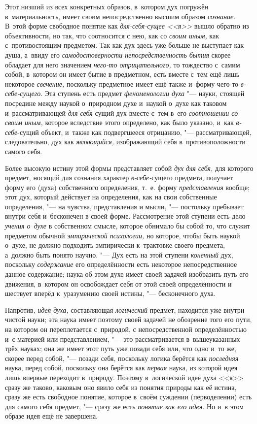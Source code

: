 Этот низший из всех конкретных образов, в~котором дух погружён
в~материальность, имеет своим непосредственно высшим образом
{\em сознание}. В~этой
форме свободное понятие как
{\em для-себя-сущее <<я>>}
вышло обратно из объективности, но так, что соотносится с
нею, как со {\em своим иным,}
как с~противостоящим предметом. Так как дух здесь уже больше
не выступает как душа, а~ввиду его
{\em самодостоверности
непосредственность бытия} скорее обладает для него значением
{\em чего-то отрицательного,}
то тождество с~самим собой, в~котором он имеет бытие в
предметном, есть вместе с~тем ещё лишь некоторое
{\em свечение,} поскольку
предметное имеет ещё также и~форму чего-то
{\em в-себе-сущего}. Эта
ступень есть предмет {\em феноменологии
духа} "--- науки, стоящей посредине между наукой о~природном
духе и~наукой о~духе как таковом и~рассматривающей
{\em для-себя}-сущий
дух вместе с~тем в~его {\em соотношении
со своим иным,} которое вследствие этого определено, как
было указано, и~как
{\em в-себе}-сущий
объект, и~также как подвергшееся отрицанию, "---
рассматривающей, следовательно, дух как
{\em являющийся,}
изображающий себя в~противоположности самого себя.

Более высокую истину этой формы представляет собой
{\em дух для себя,} для
которого предмет, носящий для сознания характер
{\em в-себе-}сущего
предмета, получает форму его (духа) собственного определения, т.~е. форму
{\em представления}
вообще; этот дух, который действует на определения, как на
свои собственные определения, "--- на чувства, представления и
мысли, "--- постольку пребывает внутри себя и~бесконечен в
своей форме. Рассмотрение этой ступени есть дело
{\em учения о~духе} в
собственном смысле, которое обнимало бы собой то, что служит предметом
обычной {\em эмпирической психологии,}
но которое, чтобы быть наукой о~духе, не должно подходить
эмпирически к~трактовке своего предмета, а~должно быть понято научно. "---
Дух есть на этой ступени
{\em конечный} дух,
поскольку {\em содержание}
его определённости есть некоторое непосредственное данное
содержание; наука об этом духе имеет своей задачей изобразить путь его
движения, в~котором он освобождает себя от этой своей определённости и
шествует вперёд к~уразумению своей истины, "--- бесконечного
духа.

Напротив, {\em идея духа,}
составляющая
{\em логический} предмет,
находится уже внутри чистой науки; эта наука имеет поэтому своей задачей не
обозрение того его пути, на котором он переплетается с~природой, с
непосредственной определённостью и~с материей или
представлением, "--- это рассматривается в~вышеуказанных трёх
науках; она же имеет этот путь уже позади себя или, что одно и~то же,
скорее перед собой, "--- позади себя, поскольку логика берётся
как {\em последняя}
наука, перед собой, поскольку она берётся как
{\em первая} наука, из
которой идея лишь впервые переходит в~природу. Поэтому в~логической идее
духа <<я>> сразу же таково, каковым оно явило себя из понятия природы как её
истина, сразу же есть свободное понятие, которое в~своём суждении
(перводелении) есть для самого себя предмет, "--- сразу же есть
{\em понятие как его идея}.
Но и~в этом образе идея ещё не завершена.

